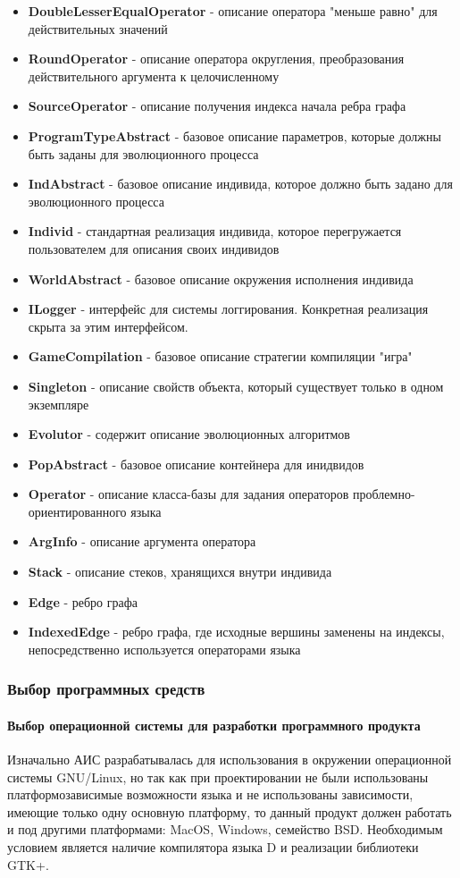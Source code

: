 \documentclass[russian,utf8,emptystyle]{eskdtext}
\begin{document}
\begin{itemize}
\item \textbf{DoubleLesserEqualOperator} - описание оператора "меньше равно" для действительных значений
\item \textbf{RoundOperator} - описание оператора округления, преобразования действительного аргумента к целочисленному
\item \textbf{SourceOperator} - описание получения индекса начала ребра графа
\item \textbf{ProgramTypeAbstract} - базовое описание параметров, которые должны быть заданы для эволюционного процесса
\item \textbf{IndAbstract} - базовое описание индивида, которое должно быть задано для эволюционного процесса
\item \textbf{Individ} - стандартная реализация индивида, которое перегружается пользователем для описания своих индивидов
\item \textbf{WorldAbstract} - базовое описание окружения исполнения индивида
\item \textbf{ILogger} - интерфейс для системы логгирования. Конкретная реализация скрыта за этим интерфейсом.
\item \textbf{GameCompilation} - базовое описание стратегии компиляции "игра"
\item \textbf{Singleton} - описание свойств объекта, который существует только в одном экземпляре
\item \textbf{Evolutor} - содержит описание эволюционных алгоритмов
\item \textbf{PopAbstract} - базовое описание контейнера для инидвидов
\item \textbf{Operator} - описание класса-базы для задания операторов проблемно-ориентированного языка
\item \textbf{ArgInfo} - описание аргумента оператора
\item \textbf{Stack}  - описание стеков, хранящихся внутри индивида
\item \textbf{Edge} - ребро графа
\item \textbf{IndexedEdge} - ребро графа, где исходные вершины заменены на индексы, непосредственно используется операторами языка
\end{itemize}

\subsubsection{Выбор программных средств}

\paragraph{Выбор операционной системы для разработки программного продукта}
Изначально АИС разрабатывалась для использования в окружении операционной системы GNU/Linux, но так как при проектировании не были использованы платформозависимые возможности языка и не использованы зависимости, имеющие только одну основную платформу, то данный продукт должен работать и под другими платформами: MacOS, Windows, семейство BSD. Необходимым условием является наличие компилятора языка D и реализации библиотеки GTK+.
\end{document}
